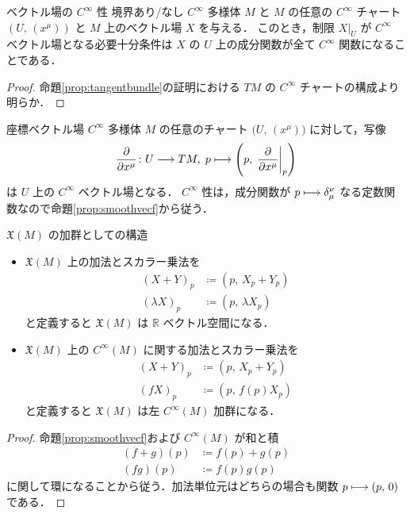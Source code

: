\documentclass[TQFT_main]{subfiles}
\begin{document}
\begin{myprop}[label=prop:smoothvecf]{ベクトル場の $C^\infty$ 性}
    境界あり/なし $C^\infty$ 多様体 $M$ と $M$ の任意の $C^\infty$ チャート $(U,\, (x^\mu))$ と $M$ 上のベクトル場 $X$ を与える．
    このとき，制限 $X|_U$ が $C^\infty$ ベクトル場となる必要十分条件は $X$ の $U$ 上の成分関数が全て $C^\infty$ 関数になることである．
\end{myprop}

\begin{proof}
    命題\ref{prop:tangentbundle}の証明における $TM$ の $C^\infty$ チャートの構成より明らか．
\end{proof}

\begin{myexample}[label=def:coord-vecf]{座標ベクトル場}
    $C^\infty$ 多様体 $M$ の任意のチャート $\bigl( U,\, (x^\mu) \bigr)$ に対して，写像
    \begin{align}
        \pdv{}{x^\mu} \colon U \lto TM,\; p \lmto \left(p,\, \eval{\pdv{}{x^\mu}}_p\right)
    \end{align}
    は $U$ 上の $C^\infty$ ベクトル場となる．
    $C^\infty$ 性は，成分関数が $p \longmapsto \delta^\nu_\mu$ なる定数関数なので命題\ref{prop:smoothvecf}から従う．
\end{myexample}

\begin{myprop}[label=prop:vecf-module]{$\mathfrak{X}(M)$ の加群としての構造}
    \begin{itemize}
        \item $\mathfrak{X}(M)$ 上の加法とスカラー乗法を
        \begin{align}
            (X + Y)_p &\coloneqq (p,\, X_p + Y_p) \\
            (\lambda X)_p &\coloneqq (p,\, \lambda X_p)
        \end{align}
        と定義すると $\mathfrak{X}(M)$ は $\mathbb{R}$ ベクトル空間になる．
        \item $\mathfrak{X}(M)$ 上の $C^\infty (M)$ に関する加法とスカラー乗法を
        \begin{align}
            (X + Y)_p &\coloneqq (p,\, X_p + Y_p) \\
            (f X)_p &\coloneqq (p,\, f(p) X_p)
        \end{align}
        と定義すると $\mathfrak{X}(M)$ は左 $C^\infty (M)$ 加群になる．
    \end{itemize}
\end{myprop}

\begin{proof}
    命題\ref{prop:smoothvecf}および $C^\infty(M)$ が和と積
    \begin{align}
        (f + g)(p) &\coloneqq f(p) + g(p) \\
        (fg)(p) &\coloneqq f(p) g(p)
    \end{align}
    に関して環になることから従う．加法単位元はどちらの場合も関数 $p \longmapsto (p,\, 0)$ である．
\end{proof}
\end{document}
